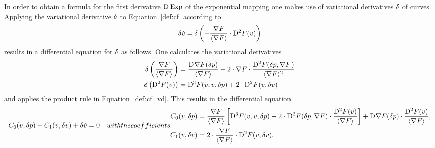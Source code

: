 In order to obtain a formula for the first derivative $ \mathrm{D}^{  } \operatorname{Exp}  $
of the exponential mapping one makes use
of variational derivatives $ \delta $ of curves.
Applying the variational derivative $ \delta $
to Equation~\eqref{def:cf} according to
\begin{align}
    \delta \dot{ v }  =
    \delta \left(
        -\frac{ \nabla F }{ \langle  \nabla F  \rangle }  \cdot
        \mathrm{D}^{ 2 }F( v ) \right)
    \label{def:cf_vd}
\end{align}
results in a differential equation for $ \delta $ as follows.
One calculates the variational derivatives
\begin{subequations}
    \begin{align}
    \delta \left( \frac{ \nabla F  }{ \langle  \nabla F   \rangle } \right)
    &=
    \frac{ \mathrm{D}^{  } \nabla F  ( \delta p ) }{ \langle  \nabla F   \rangle }  -
    2 \cdot \nabla F  \cdot
    \frac{ \mathrm{D}^{  2  } F ( \delta p, \nabla F  ) }{ \langle  \nabla F   \rangle^2 }
    \\
    \delta\left( \mathrm{D}^{  2  } F ( v ) \right)
    &=
    \mathrm{D}^{  3  } F ( v, v, \delta p )  +
    2 \cdot \mathrm{D}^{  2  } F ( v, \delta v )
    \end{align}
\end{subequations}
and applies the product rule in Equation~\eqref{def:cf_vd}.
This results in the differential equation
\begin{subequations}
    \label{def:cf_vd_dgl}
    \begin{align}
        C_0( v, \vardiff p )  +  C_1( v, \vardiff v )  +  \vardiff \dot{ v }
        &=
        0
        \label{def:cf_vd_dgl:a}
    \end{align}
    with the coefficients
    \begin{align}
        C_0( v, \vardiff p )
        &=
        \frac{ \grad{F} }{ \skaq{ \grad{F} } }
        \left[  \diff{3}{F}( v, v, \vardiff p )  -
        2 \mult \diff{2}{F}( \vardiff p, \grad{F} ) \mult
        \frac{ \diff{2}{F}( v ) }{ \skaq{\grad{F}} }  \right]  +
        \diff{}{\grad{F}}( \vardiff p ) \mult
        \frac{ \diff{2}{F}( v ) }{ \skaq{\grad{F}} } ,
        \label{def:cf_vd_dgl:b}
        \\
        C_1( v, \vardiff v )
        &=
        2 \mult \frac{ \grad{F} }{ \skaq{ \grad{F} } }  \mult
        \diff{2}{F}( v, \vardiff v ) .
        \label{def:cf_vd_dgl:c}
    \end{align}
\end{subequations}


